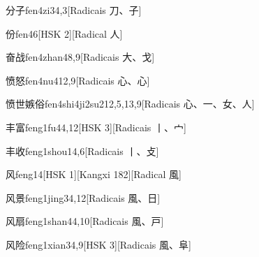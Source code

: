 \begin{entry}{分子}{fen4zi3}{4,3}[Radicais ⼑、⼦]
\end{entry}

\begin{entry}{份}{fen4}{6}[HSK 2][Radical ⼈]
\end{entry}

\begin{entry}{奋战}{fen4zhan4}{8,9}[Radicais ⼤、⼽]
\end{entry}

\begin{entry}{愤怒}{fen4nu4}{12,9}[Radicais ⼼、⼼]
\end{entry}

\begin{entry}{愤世嫉俗}{fen4shi4ji2su2}{12,5,13,9}[Radicais ⼼、⼀、⼥、⼈]
\end{entry}

\begin{entry}{丰富}{feng1fu4}{4,12}[HSK 3][Radicais ⼁、⼧]
\end{entry}

\begin{entry}{丰收}{feng1shou1}{4,6}[Radicais ⼁、⽁]
\end{entry}

\begin{entry}{风}{feng1}{4}[HSK 1][Kangxi 182][Radical ⾵]
\end{entry}

\begin{entry}{风景}{feng1jing3}{4,12}[Radicais ⾵、⽇]
\end{entry}

\begin{entry}{风扇}{feng1shan4}{4,10}[Radicais ⾵、⼾]
\end{entry}

\begin{entry}{风险}{feng1xian3}{4,9}[HSK 3][Radicais ⾵、⾩]
\end{entry}

